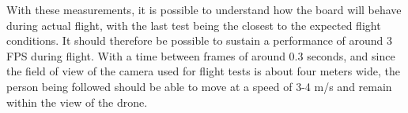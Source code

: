 With these measurements, it is possible to understand how the board will behave during actual flight, with the last test being the closest to the expected flight conditions.
It should therefore be possible to sustain a performance of around 3 FPS during flight.
With a time between frames of around 0.3 seconds, and since the field of view of the camera used for flight tests is about four meters wide, the person being followed should be able to move at a speed of 3-4 m/s and remain within the view of the drone.


